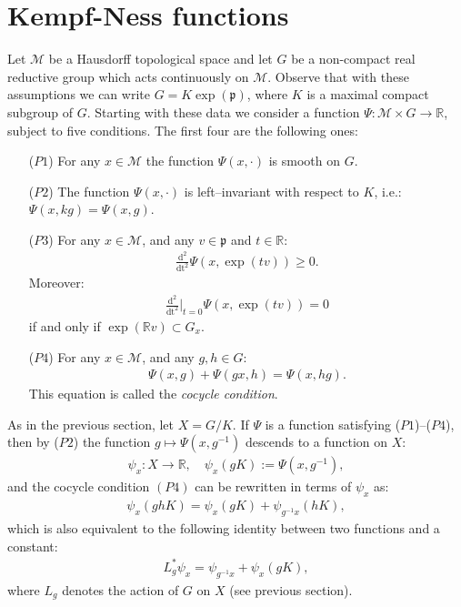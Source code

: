 \documentclass[leqno,11pt, a4]{amsart}
\theoremstyle{named}
\begin{document}
\section{Kempf-Ness functions}
\label{sec:abstract-setting}
  Let ${\mathscr{M}}$ be a Hausdorff topological space and let $G$ be a non-compact real reductive group which acts continuously on ${\mathscr{M}}$. Observe that with these assumptions we can write $G=K\exp ({\mathfrak{p}})$, where $K$ is a maximal compact subgroup of $G$. Starting with these data we  consider a
  function $ \Psi : {\mathscr{M}} \times G {\rightarrow} {\mathbb{R}}$, subject to five conditions.
  The first four are the following ones:
  \begin{enumerate}
  \item[($P1$)] For any $x\in {\mathscr{M}}$ the function $ \Psi(x,{\cdot} )$
    is smooth on $G$.
  \item[($P2$)] The function $\Psi(x, {\cdot} )$ is left--invariant
    with respect to $K$, i.e.: $\Psi(x,kg) = \Psi(x,g)$.
  \item[($P3$)] For any $x\in {\mathscr{M}}$, and any ${{v}} \in {\mathfrak{p}}$ and
    $t\in {\mathbb{R}}${:}
    \begin{gather*}
      \frac{\mathrm{d^2}}{\mathrm{dt}^2 } \Psi(x,\exp(t{{v}})) \geq 0.
    \end{gather*}
    Moreover:
    \begin{gather*}
      \frac{\mathrm{d^2}}{\mathrm{dt}^2 }\bigg \vert_{t=0}
      \Psi(x,\exp(t{{v}})) = 0
    \end{gather*}
    if and only if $\exp({\mathbb{R}} {{v}}) \subset G_x$.
    
  \item[($P4$)] For any $x\in {\mathscr{M}}$, and any $g, h\in G$:
    \begin{gather*}
      \Psi(x,g) + \Psi({gx}, h) = \Psi(x,hg).
    \end{gather*}
    This equation is called the \emph{cocycle condition}.
  \end{enumerate}
  As in the previous section, let $X=G/K.$
If $\Psi$ is a
  function satisfying ($P1$)--($P4$), then by ($P2$) the
  function $g\mapsto \Psi(x, g{^{-1}})$ descends to a function on $X$:
  \begin{gather}
    \label{defpsi}
    \psi_x: X {\rightarrow}{\mathbb{R}}, \quad \psi_x(gK) := \Psi(x, g{^{-1}}),
  \end{gather}
  and the cocycle condition $(P4)$ can be rewritten in terms of $\psi_x$ as:
  \begin{gather}
    \tag{$P4'$}
    \label{cociclo-psi}
    \psi_x(ghK) = \psi_x (gK) + \psi_{g{^{-1}} x} (hK),
  \end{gather}
which is also equivalent to the following identity between
  two functions and a constant:
  \begin{gather}
    \label{cociclo-3}
    L_g^* \psi_x = \psi_{g{^{-1}} x} + \psi_x(gK),
  \end{gather}
\label{say-def-la}
where $L_g$ denotes the action of $G$ on $X$ (see previous section).
  
\end{document}
